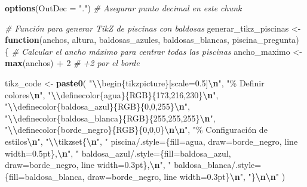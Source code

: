 \documentclass[
]{article}
\newenvironment{Shaded}{\begin{snugshade}}{\end{snugshade}}
\newcommand{\AttributeTok}[1]{\textcolor[rgb]{0.13,0.29,0.53}{#1}}
\newcommand{\CommentTok}[1]{\textcolor[rgb]{0.56,0.35,0.01}{\textit{#1}}}
\newcommand{\ControlFlowTok}[1]{\textcolor[rgb]{0.13,0.29,0.53}{\textbf{#1}}}
\newcommand{\DecValTok}[1]{\textcolor[rgb]{0.00,0.00,0.81}{#1}}
\newcommand{\FunctionTok}[1]{\textcolor[rgb]{0.13,0.29,0.53}{\textbf{#1}}}
\newcommand{\NormalTok}[1]{#1}
\newcommand{\OtherTok}[1]{\textcolor[rgb]{0.56,0.35,0.01}{#1}}
\newcommand{\SpecialCharTok}[1]{\textcolor[rgb]{0.81,0.36,0.00}{\textbf{#1}}}
\newcommand{\StringTok}[1]{\textcolor[rgb]{0.31,0.60,0.02}{#1}}
\begin{document}
\begin{Shaded}
\begin{Highlighting}[]
\FunctionTok{options}\NormalTok{(}\AttributeTok{OutDec =} \StringTok{"."}\NormalTok{)  }\CommentTok{\# Asegurar punto decimal en este chunk}

\CommentTok{\# Función para generar TikZ de piscinas con baldosas}
\NormalTok{generar\_tikz\_piscinas }\OtherTok{\textless{}{-}} \ControlFlowTok{function}\NormalTok{(anchos, altura, baldosas\_azules, baldosas\_blancas, piscina\_pregunta) \{}
  \CommentTok{\# Calcular el ancho máximo para centrar todas las piscinas}
\NormalTok{  ancho\_maximo }\OtherTok{\textless{}{-}} \FunctionTok{max}\NormalTok{(anchos) }\SpecialCharTok{+} \DecValTok{2}  \CommentTok{\# +2 por el borde}
  
\NormalTok{  tikz\_code }\OtherTok{\textless{}{-}} \FunctionTok{paste0}\NormalTok{(}
    \StringTok{"}\SpecialCharTok{\textbackslash{}\textbackslash{}}\StringTok{begin\{tikzpicture\}[scale=0.5]}\SpecialCharTok{\textbackslash{}n}\StringTok{"}\NormalTok{,}
    \StringTok{"\% Definir colores}\SpecialCharTok{\textbackslash{}n}\StringTok{"}\NormalTok{,}
    \StringTok{"}\SpecialCharTok{\textbackslash{}\textbackslash{}}\StringTok{definecolor\{agua\}\{RGB\}\{173,216,230\}}\SpecialCharTok{\textbackslash{}n}\StringTok{"}\NormalTok{,}
    \StringTok{"}\SpecialCharTok{\textbackslash{}\textbackslash{}}\StringTok{definecolor\{baldosa\_azul\}\{RGB\}\{0,0,255\}}\SpecialCharTok{\textbackslash{}n}\StringTok{"}\NormalTok{,}
    \StringTok{"}\SpecialCharTok{\textbackslash{}\textbackslash{}}\StringTok{definecolor\{baldosa\_blanca\}\{RGB\}\{255,255,255\}}\SpecialCharTok{\textbackslash{}n}\StringTok{"}\NormalTok{,}
    \StringTok{"}\SpecialCharTok{\textbackslash{}\textbackslash{}}\StringTok{definecolor\{borde\_negro\}\{RGB\}\{0,0,0\}}\SpecialCharTok{\textbackslash{}n\textbackslash{}n}\StringTok{"}\NormalTok{,}
    \StringTok{"\% Configuración de estilos}\SpecialCharTok{\textbackslash{}n}\StringTok{"}\NormalTok{,}
    \StringTok{"}\SpecialCharTok{\textbackslash{}\textbackslash{}}\StringTok{tikzset\{}\SpecialCharTok{\textbackslash{}n}\StringTok{"}\NormalTok{,}
    \StringTok{"  piscina/.style=\{fill=agua, draw=borde\_negro, line width=0.5pt\},}\SpecialCharTok{\textbackslash{}n}\StringTok{"}\NormalTok{,}
    \StringTok{"  baldosa\_azul/.style=\{fill=baldosa\_azul, draw=borde\_negro, line width=0.3pt\},}\SpecialCharTok{\textbackslash{}n}\StringTok{"}\NormalTok{,}
    \StringTok{"  baldosa\_blanca/.style=\{fill=baldosa\_blanca, draw=borde\_negro, line width=0.3pt\}}\SpecialCharTok{\textbackslash{}n}\StringTok{"}\NormalTok{,}
    \StringTok{"\}}\SpecialCharTok{\textbackslash{}n\textbackslash{}n}\StringTok{"}
\NormalTok{  )}
  

\end{Highlighting}
\end{Shaded}
\end{document}
